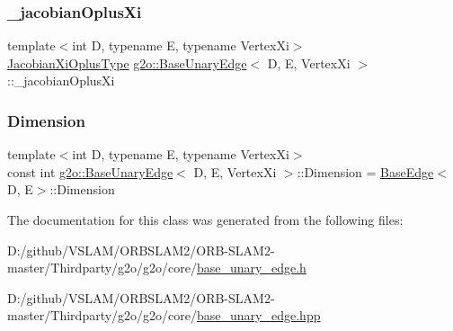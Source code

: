 \subsubsection{\texorpdfstring{\+\_\+jacobian\+Oplus\+Xi}{\_jacobianOplusXi}}
{\footnotesize\ttfamily template$<$int D, typename E, typename Vertex\+Xi$>$ \\
\mbox{\hyperlink{classg2o_1_1_base_unary_edge_a24bcabd661223e15b7337f2835310f5e}{Jacobian\+Xi\+Oplus\+Type}} \mbox{\hyperlink{classg2o_1_1_base_unary_edge}{g2o\+::\+Base\+Unary\+Edge}}$<$ D, E, Vertex\+Xi $>$\+::\+\_\+jacobian\+Oplus\+Xi\hspace{0.3cm}{\ttfamily [protected]}}

\mbox{\label{classg2o_1_1_base_unary_edge_a4e584cf552998a34948d8d5b484f7fd3}} 
\subsubsection{\texorpdfstring{Dimension}{Dimension}}
{\footnotesize\ttfamily template$<$int D, typename E, typename Vertex\+Xi$>$ \\
const int \mbox{\hyperlink{classg2o_1_1_base_unary_edge}{g2o\+::\+Base\+Unary\+Edge}}$<$ D, E, Vertex\+Xi $>$\+::Dimension = \mbox{\hyperlink{classg2o_1_1_base_edge}{Base\+Edge}}$<$D, E$>$\+::Dimension\hspace{0.3cm}{\ttfamily [static]}}



The documentation for this class was generated from the following files\+:\begin{DoxyCompactItemize}
\item 
D\+:/github/\+V\+S\+L\+A\+M/\+O\+R\+B\+S\+L\+A\+M2/\+O\+R\+B-\/\+S\+L\+A\+M2-\/master/\+Thirdparty/g2o/g2o/core/\mbox{\hyperlink{base__unary__edge_8h}{base\+\_\+unary\+\_\+edge.\+h}}\item 
D\+:/github/\+V\+S\+L\+A\+M/\+O\+R\+B\+S\+L\+A\+M2/\+O\+R\+B-\/\+S\+L\+A\+M2-\/master/\+Thirdparty/g2o/g2o/core/\mbox{\hyperlink{base__unary__edge_8hpp}{base\+\_\+unary\+\_\+edge.\+hpp}}\end{DoxyCompactItemize}
